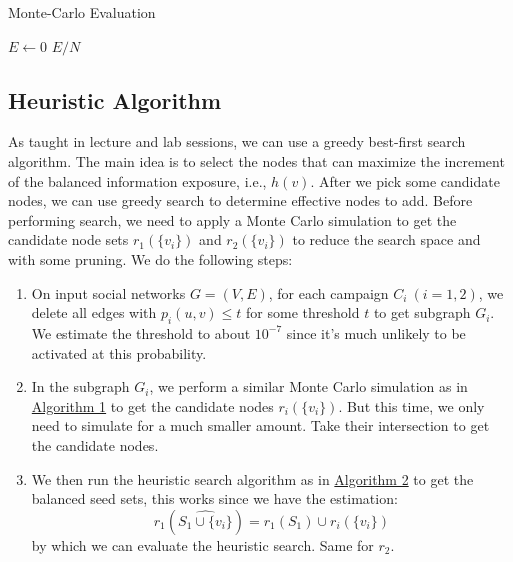 \documentclass{article}
\begin{document}
\begin{algorithm}
\caption{Monte-Carlo Evaluation}\label{alg:monte-carlo}
$E\leftarrow 0$\;
\Return $E/N$\;
\end{algorithm}

\subsection{Heuristic Algorithm}
As taught in lecture and lab sessions, we can use a greedy best-first search algorithm. The main idea is to select the nodes that can maximize the increment of the balanced information exposure, i.e., $h(v)$. After we pick some candidate nodes, we can use greedy search to determine effective nodes to add.
Before performing search, we need to apply a Monte Carlo simulation to get the candidate node sets $r_1(\{v_i\})$ and $r_2(\{v_i\})$ to reduce the search space and with some pruning. We do the following steps:

\begin{enumerate}
    \item On input social networks $G = (V, E)$, for each campaign $C_i\ (i = 1, 2)$, we delete all edges with $p_i(u, v) \le t$ for some threshold $t$ to get subgraph $G_i$. We estimate the threshold to about $10^{-7}$ since it's much unlikely to be activated at this probability.
    \item In the subgraph $G_i$, we perform a similar Monte Carlo simulation as in \hyperlink{alg:monte-carlo}{Algorithm 1} to get the candidate nodes $r_i(\{v_i\})$. But this time, we only need to simulate for a much smaller amount. Take their intersection to get the candidate nodes.
    \item We then run the heuristic search algorithm as in \hyperlink{alg:heuristic}{Algorithm 2} to get the balanced seed sets, this works since we have the estimation: \[ r_1(\widehat{S_1\cup \{v_i\}}) = r_1(S_1) \cup r_i(\{v_i\}) \] by which we can evaluate the heuristic search. Same for $r_2$.
\end{enumerate}
\end{document}

